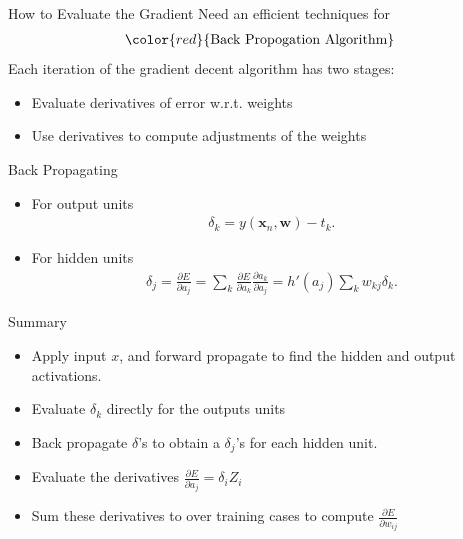 \documentclass[10pt, hyperref={colorlinks = true,linkcolor = blue}]{beamer}
\begin{document}
{{{\begin{frame}{How to Evaluate the Gradient}
Need an efficient techniques for {\color{violet}{evaluating the gradient $\nabla E$}}
\begin{align*}
{\color{red}{\text{Back Propogation Algorithm}}}
\end{align*}
Each iteration of the gradient decent algorithm has two stages:
\begin{itemize}
\item Evaluate derivatives of error w.r.t. weights
\item Use derivatives to compute adjustments of the weights 
\end{itemize}
\end{frame}

\begin{frame}{Back Propagating}
\begin{itemize}
\item For output units
\begin{align*}
\delta_k = y(\bm x_n, \bm w) - t_k.
\end{align*}
\item For hidden units 
\begin{align*}
\delta_j = \frac{\partial E}{\partial a_j} = \sum_{k}  \frac{\partial E}{\partial a_k} \frac{\partial a_k}{\partial a_j} = h'\left(a_j\right) \sum_{k} w_{kj} \delta_k.
\end{align*}
\end{itemize}
Summary
\begin{itemize}
\item Apply input $x$, and forward propagate to find the hidden and output activations. 
\item Evaluate $\delta_k$ directly for the outputs units
\item Back propagate $\delta$'s to obtain a $\delta_j$'s for each hidden unit.
\item Evaluate the derivatives  $\frac{\partial E}{\partial a_j} = \delta_i Z_i$
\item  Sum these derivatives to over training cases to compute $\frac{\partial E}{\partial w_{ij}} $  
\end{itemize}
\end{frame}
}

}}
\end{document}

